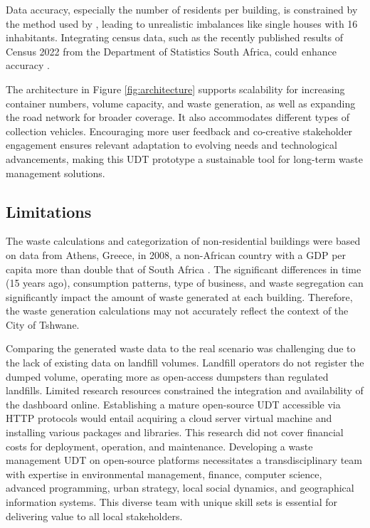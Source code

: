 \documentclass[authoryear,preprint,review,doubleblind, 12pt]{elsarticle}
\begin{document}
    Data accuracy, especially the number of residents per building, is constrained by the method used by \citet{Schiavina2022}, leading to unrealistic imbalances like single houses with 16 inhabitants. Integrating census data, such as the recently published results of Census 2022 from the Department of Statistics South Africa, could enhance accuracy \citep{statisticssouthafricaCensus202223}.

    The architecture in Figure \ref{fig:architecture} supports scalability for increasing container numbers, volume capacity, and waste generation, as well as expanding the road network for broader coverage. It also accommodates different types of collection vehicles. Encouraging more user feedback and co-creative stakeholder engagement ensures relevant adaptation to evolving needs and technological advancements, making this UDT prototype a sustainable tool for long-term waste management solutions.

    \subsection{Limitations} \label{subsec:limitations}

    The waste calculations and categorization of non-residential buildings were based on data from Athens, Greece, in 2008, a non-African country with a GDP per capita more than double that of South Africa  \citep{Bank2021}. The significant differences in time (15 years ago), consumption patterns, type of business, and waste segregation can significantly impact the amount of waste generated at each building. Therefore, the waste generation calculations may not accurately reflect the context of the City of Tshwane.

    Comparing the generated waste data to the real scenario was challenging due to the lack of existing data on landfill volumes. Landfill operators do not register the dumped volume, operating more as open-access dumpsters than regulated landfills. Limited research resources constrained the integration and availability of the dashboard online. Establishing a mature open-source UDT accessible via HTTP protocols would entail acquiring a cloud server virtual machine and installing various packages and libraries. This research did not cover financial costs for deployment, operation, and maintenance. Developing a waste management UDT on open-source platforms necessitates a transdisciplinary team with expertise in environmental management, finance, computer science, advanced programming, urban strategy, local social dynamics, and geographical information systems. This diverse team with unique skill sets is essential for delivering value to all local stakeholders.
\end{document}

